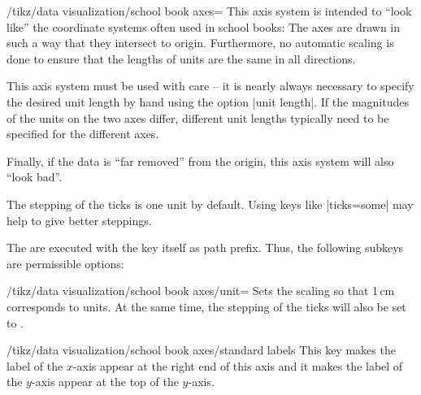 \begin{key}{/tikz/data visualization/school book axes=}
    This axis system is intended to ``look like'' the coordinate systems often
    used in school books: The axes are drawn in such a way that they intersect
    to origin. Furthermore, no automatic scaling is done to ensure that the
    lengths of units are the same in all directions.

    This axis system must be used with care -- it is nearly always necessary to
    specify the desired unit length by hand using the option |unit length|. If
    the magnitudes of the units on the two axes differ, different unit lengths
    typically need to be specified for the different axes.

    Finally, if the data is ``far removed'' from the origin, this axis system
    will also ``look bad''.
\begin{codeexample}[]
\end{codeexample}

    The stepping of the ticks is one unit by default. Using keys like
    |ticks=some| may help to give better steppings.

    The  are executed with the key itself as path prefix. Thus,
    the following subkeys are permissible options:
    \begin{key}{/tikz/data visualization/school book axes/unit=}
        Sets the scaling so that 1\,cm corresponds to  units. At
        the same time, the stepping of the ticks will also be set to
        .
\begin{codeexample}[]
\end{codeexample}
    \end{key}

    \begin{key}{/tikz/data visualization/school book axes/standard labels}
        This key makes the label of the $x$-axis appear at the right end of
        this axis and it makes the label of the $y$-axis appear at the top of
        the $y$-axis.


\end{key}
\end{key}
